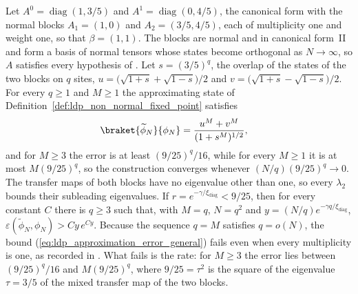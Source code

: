 \begin{lemma}
    \label{thm:ldp_approximation_error_overlapping_blocks}
    \leanok
    Let $A^0=\operatorname{diag}(1,3/5)$ and $A^1=\operatorname{diag}(0,4/5)$,
    the canonical form with the normal blocks $A_1=(1,0)$ and $A_2=(3/5,4/5)$, each
    of multiplicity one and weight one, so that $\beta=(1,1)$. The blocks are
    normal and in canonical form~II and form a basis of normal tensors whose
    states become orthogonal as $N\to\infty$, so $A$
    satisfies every hypothesis of \cite[Lemma~1$'$(ii)]{Malz2024Preparation}.
    Let $s=(3/5)^q$,
    the overlap of the states of the two blocks on $q$ sites,
    $u=\bigl(\sqrt{1+s}+\sqrt{1-s}\bigr)/2$ and
    $v=\bigl(\sqrt{1+s}-\sqrt{1-s}\bigr)/2$. For every $q\geq1$ and $M\geq1$ the
    approximating state of Definition~\ref{def:ldp_non_normal_fixed_point}
    satisfies
    \begin{align}
        \braket{\widetilde\phi_N}{\phi_N}
         & =\frac{u^M+v^M}{(1+s^M)^{1/2}},
        \label{eq:ldp_overlapping_blocks_overlap}
    \end{align}
    and for $M\geq3$ the error is at least $(9/25)^q/16$, while for every $M\geq1$
    it is at most $M(9/25)^q$, so the construction converges whenever
    $(N/q)(9/25)^q\to0$. The transfer maps of both
    blocks have no eigenvalue other than one, so every $\lambda_2$ bounds their
    subleading eigenvalues. If $r=e^{-\gamma/\xi_{\mathrm{diag}}}<9/25$, then for every
    constant $C$ there is $q\geq3$ such that, with $M=q$, $N=q^2$ and
    $y=(N/q)e^{-\gamma q/\xi_{\mathrm{diag}}}$,
    $\varepsilon(\widetilde\phi_N,\phi_N)>Cy\,e^{Cy}$. Because the sequence $q=M$ satisfies
    $q=o(N)$, the bound (\ref{eq:ldp_approximation_error_general}) fails even
    when every multiplicity is one, as recorded in \cite{gap:mswc24_block_form_mixed_overlap}. What
    fails is the rate: for $M\geq3$ the error lies between $(9/25)^q/16$ and
    $M(9/25)^q$, where $9/25=\tau^2$ is the square of the eigenvalue $\tau=3/5$ of
    the mixed transfer map of the two blocks.
\end{lemma}

